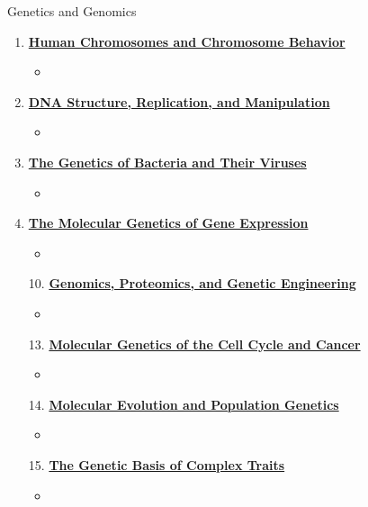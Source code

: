 \documentclass[12pt,letterpaper]{article}
\begin{document}
\begin{chapbox}{Genetics and Genomics}
{\begin{enumerate}[font=\bfseries, wide]
\begin{itemize}
        \item \hyperlink{4.6}{Recombination is initiated by a double-stranded break in DNA}
    \end{itemize}
    \item \hyperlink{5}{\textbf{Human Chromosomes and Chromosome Behavior}}
    \begin{itemize}
        \item 
    \end{itemize}
    \item \hyperlink{6}{\textbf{DNA Structure, Replication, and Manipulation}}
    \begin{itemize}
        \item 
    \end{itemize}
    \item \hyperlink{7}{\textbf{The Genetics of Bacteria and Their Viruses}}
    \begin{itemize}
        \item 
    \end{itemize}
    \item \hyperlink{8}{\textbf{The Molecular Genetics of Gene Expression}}
    \begin{itemize}
        \item 
    \end{itemize}
    \item [10.] \hyperlink{10}{\textbf{Genomics, Proteomics, and Genetic Engineering}}
    \begin{itemize}
        \item 
    \end{itemize}
    \item [13.] \hyperlink{13}{\textbf{Molecular Genetics of the Cell Cycle and Cancer}}
    \begin{itemize}
        \item 
    \end{itemize}    
    \item [14.] \hyperlink{14}{\textbf{Molecular Evolution and Population Genetics}}
    \begin{itemize}
        \item 
    \end{itemize}
    \item [15.] \hyperlink{15}{\textbf{The Genetic Basis of Complex Traits}}
    \begin{itemize}
        \item 
    \end{itemize}
\end{enumerate}
}\end{chapbox}
\end{document}
